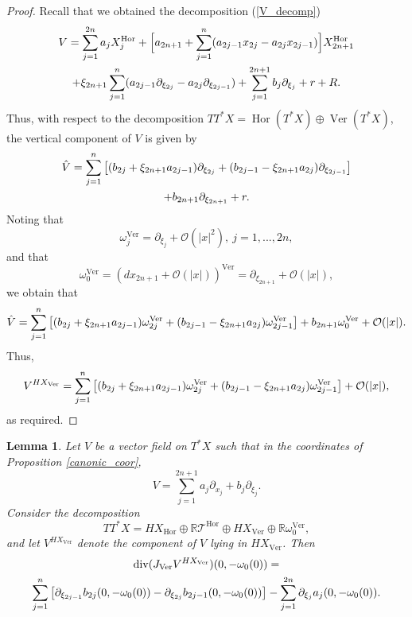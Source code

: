 \documentclass{article}
\newtheorem{lemma}[theorem]{Lemma}
\newcommand{\RR}{\mathbb R}
\newcommand{\mct}{\mathcal T}
\newcommand{\mco}{\mathcal O}
\DeclareMathOperator{\Div}{div}
\DeclareMathOperator{\Hor}{Hor}
\DeclareMathOperator{\Ver}{Ver}
\begin{document}
%
\begin{proof}
%
Recall that we obtained the decomposition (\ref{V_decomp}) \begin{multline*} V = \sum_{j=1}^{2n} a_j X_j^{\Hor} + \Big{[} a_{2n+1} + \sum_{j=1}^n (a_{2j-1} x_{2j} - a_{2j} x_{2j-1}) \Big{]} X_{2n+1}^{\Hor} \\ + \xi_{2n+1} \sum_{j=1}^n (a_{2j-1} \partial_{\xi_{2j}} - a_{2j} \partial_{\xi_{2j-1}} ) + \sum_{j=1}^{2n+1} b_j \partial_{\xi_j} + r + R.\end{multline*}
%
%
Thus, with respect to the decomposition $T T^*X = \Hor(T^*X) \oplus \Ver(T^*X)$, the vertical component of $V$ is given by \begin{multline*} \hat V = \sum_{j=1}^n \big{[}(b_{2j} + \xi_{2n+1} a_{2j-1}) \partial_{\xi_{2j}} + (b_{2j-1} - \xi_{2n+1} a_{2j}) \partial_{\xi_{2j-1}} \big{]} \\+ b_{2n+1} \partial_{\xi_{2n+1}} + r.\end{multline*}
%
Noting that $$\omega_j^{\Ver} = \partial_{\xi_j} + \mco(|x|^2),\ j = 1,...,2n,$$ and that $$\omega_0^{\Ver} = (dx_{2n+1} + \mco(|x|))^{\Ver} = \partial_{\xi_{2n+1}} + \mco(|x|),$$
%
we obtain that $$\hat V = \sum_{j=1}^n \big{[}(b_{2j} + \xi_{2n+1} a_{2j-1}) \omega^{\Ver}_{2j} +(b_{2j-1} - \xi_{2n+1} a_{2j}) \omega_{2j-1}^{\Ver} \big{]} + b_{2n+1} \omega_0^{\Ver} + \mco(|x|).$$
Thus, $$V^{HX_{\Ver}} = \sum_{j=1}^n \big{[}(b_{2j} + \xi_{2n+1} a_{2j-1}) \omega^{\Ver}_{2j} +(b_{2j-1} - \xi_{2n+1} a_{2j}) \omega_{2j-1}^{\Ver} \big{]} + \mco(|x|),$$
as required.
\end{proof}
%
\begin{lemma}  Let $V$ be a vector field on $T^*X$ such that in the coordinates of Proposition \ref{canonic_coor},$$V = \sum_{j=1}^{2n+1} a_j \partial_{x_j} + b_j \partial_{\xi_j}.$$ Consider the decomposition $$T T^*X = HX_{\Hor} \oplus \RR \mct^{\Hor} \oplus HX_{\Ver} \oplus \RR \omega_0^{\Ver},$$
and let $V^{HX_{\Ver}}$ denote the component of $V$ lying in $HX_{\Ver}$. Then \begin{multline*} \Div(J_{\Ver}V^{HX_{\Ver}})(0, -\omega_0(0)) = \\ \sum_{j=1}^n \big{[} \partial_{\xi_{2j-1}} b_{2j}(0, -\omega_0(0)) - \partial_{\xi_{2j}} b_{2j-1}(0, -\omega_0(0)) \big{]} -\sum_{j=1}^{2n} \partial_{\xi_j} a_j(0, -\omega_0(0)).\end{multline*} \end{lemma}
%
\end{document}
